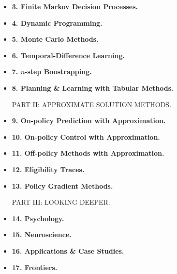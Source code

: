 \documentclass{article}
\newtheorem{example}{Example}
\begin{document}
\begin{itemize}
\begin{itemize}
        \begin{example}[Bandit Gradient Algorithm as Stochastic Gradient Ascent]
            One can gain a deeper insight into gradient bandit algorithm by understanding it as a stochastic approximation to gradient ascent. In exact {\rm gradient ascent}, each action preference $H_t(a)$ would be incremented in proportion to increment's effect on performance: (2.13)
            \begin{equation*}
                H_{t+1}(a)\coloneqq H_t(a) + \alpha\frac{\partial\mathbb{E}[R_t]}{\partial H_t(a)},
            \end{equation*}
            where measure of performance here is expected reward:
            \begin{equation*}
                \mathbb{E}[R_t] = \sum_x \pi_t(x)q_*(x),
            \end{equation*}
            \& measure of increment's effect is {\rm partial derivative} of this performance measure w.r.t. action preference.
        \end{example}
        \item {\bf2.9. Associative Search (Contextual Bandits).}
    \end{itemize}
    \item {\bf3. Finite Markov Decision Processes.}
    \item {\bf4. Dynamic Programming.}
    \item {\bf5. Monte Carlo Methods.}
    \item {\bf6. Temporal-Difference Learning.}
    \item {\bf7. $n$-step Boostrapping.}
    \item {\bf8. Planning \& Learning with Tabular Methods.}

    PART II: APPROXIMATE SOLUTION METHODS.
    \item {\bf9. On-policy Prediction with Approximation.}
    \item {\bf10. On-policy Control with Approximation.}
    \item {\bf11. Off-policy Methods with Approximation.}
    \item {\bf12. Eligibility Traces.}
    \item {\bf13. Policy Gradient Methods.}

    PART III: LOOKING DEEPER.
    \item {\bf14. Psychology.}
    \item {\bf15. Neuroscience.}
    \item {\bf16. Applications \& Case Studies.}
    \item {\bf17. Frontiers.}
\end{itemize}
\end{document}

